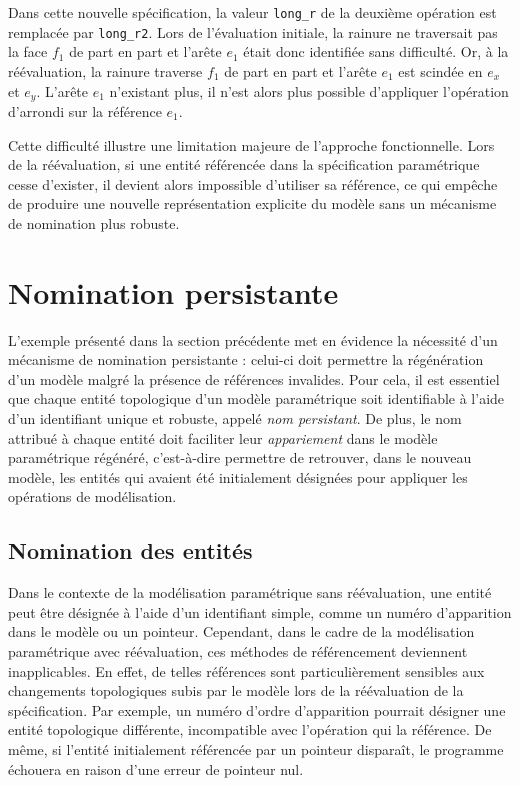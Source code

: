 Dans cette nouvelle spécification, la valeur
\texttt{long\_r} de la deuxième opération est remplacée par
\texttt{long\_r2}. %
Lors de l'évaluation initiale, la rainure ne traversait pas la face $f_{1}$ de
part en part et l'arête $e_{1}$ était donc identifiée sans difficulté. %
Or, à la réévaluation, la rainure traverse $f_{1}$ de part en part et l'arête
$e_{1}$ est scindée en $e_{x}$ et $e_{y}$. %
L'arête $e_{1}$ n'existant plus, il n'est alors plus possible
d'appliquer l'opération d'arrondi sur la référence $e_{1}$. %

Cette difficulté illustre une limitation majeure de l'approche fonctionnelle. Lors de la réévaluation, si une entité référencée dans la spécification paramétrique cesse d'exister, il devient alors impossible d'utiliser sa référence, ce qui empêche de produire une nouvelle représentation explicite du modèle sans un mécanisme de nomination plus robuste.

\section{Nomination persistante}
\label{sec:etat-art-reevaluation-nomination-persistante}

L'exemple présenté dans la section précédente met en évidence la nécessité d'un mécanisme de nomination persistante : celui-ci doit permettre la régénération d'un modèle malgré la présence de références invalides. Pour cela, il est essentiel que chaque entité topologique d'un modèle paramétrique soit identifiable à l'aide d'un identifiant unique et robuste, appelé \emph{nom persistant}. De plus, le nom attribué à chaque entité doit faciliter leur \emph{appariement} dans le modèle paramétrique régénéré, c'est-à-dire permettre de retrouver, dans le nouveau modèle, les entités qui avaient été initialement désignées pour appliquer les opérations de modélisation.




\subsection{Nomination des entités} \label{sec:etat-art-modelisation-parametric-nomination-utilisation-nom}



Dans le contexte de la modélisation paramétrique sans réévaluation, une entité peut être
désignée à l'aide d'un identifiant simple, comme un numéro d'apparition dans le
modèle ou un pointeur. Cependant, dans le cadre de la modélisation paramétrique
avec réévaluation, ces méthodes de référencement deviennent inapplicables. En
effet, de telles références sont particulièrement sensibles aux changements
topologiques subis par le modèle lors de la réévaluation de la spécification.
Par exemple, un numéro d'ordre d'apparition pourrait désigner une entité
topologique différente, incompatible avec l'opération qui la référence. De même,
si l'entité initialement référencée par un pointeur disparaît, le programme
échouera en raison d'une erreur de pointeur nul.


